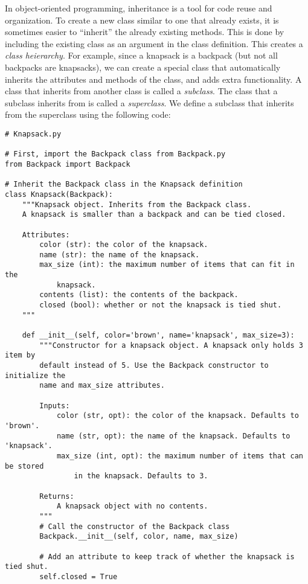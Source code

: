 In object-oriented programming, inheritance is a tool for code reuse and organization.
To create a new class similar to one that already exists, it is sometimes easier to ``inherit'' the already existing methods.
This is done by including the existing class as an argument in the class definition.
This creates a \emph{class heierarchy}.
For example, since a knapsack is a backpack (but not all backpacks are knapsacks), we can create a special  class that automatically inherits the attributes and methods of the  class, and adds extra functionality.
A class that inherits from another class is called a \emph{subclass}.
The class that a subclass inherits from is called a \emph{superclass}.
We define a  subclass that inherits from the  superclass using the following code:

\begin{lstlisting}
# Knapsack.py

# First, import the Backpack class from Backpack.py
from Backpack import Backpack

# Inherit the Backpack class in the Knapsack definition		
class Knapsack(Backpack):
    """Knapsack object. Inherits from the Backpack class.
    A knapsack is smaller than a backpack and can be tied closed.
    
    Attributes:
        color (str): the color of the knapsack.
        name (str): the name of the knapsack.
        max_size (int): the maximum number of items that can fit in the
            knapsack.
        contents (list): the contents of the backpack.
        closed (bool): whether or not the knapsack is tied shut.
    """
    
    def __init__(self, color='brown', name='knapsack', max_size=3):
        """Constructor for a knapsack object. A knapsack only holds 3 item by
        default instead of 5. Use the Backpack constructor to initialize the
        name and max_size attributes.
        
        Inputs:
            color (str, opt): the color of the knapsack. Defaults to 'brown'.
            name (str, opt): the name of the knapsack. Defaults to 'knapsack'.
            max_size (int, opt): the maximum number of items that can be stored
                in the knapsack. Defaults to 3.
        
        Returns:
            A knapsack object with no contents.
        """
        # Call the constructor of the Backpack class
        Backpack.__init__(self, color, name, max_size)
        
        # Add an attribute to keep track of whether the knapsack is tied shut.
        self.closed = True
\end{lstlisting}

